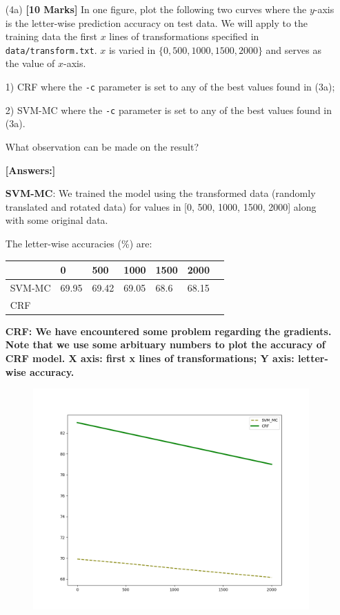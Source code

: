 \documentclass[11pt]{report}
\begin{document}
\begin{itemize}
	\item[(4a)] {\bf [10 Marks]} In one figure, plot the following two curves where the $y$-axis is the letter-wise prediction accuracy on test data.  We will apply to the training data the first $x$ lines of transformations specified in \verb#data/transform.txt#.  $x$ is varied in $\{0, 500, 1000, 1500, 2000\}$ and serves as the value of $x$-axis.
	
	1) CRF where the \verb#-c# parameter is set to any of the best values found in (3a);
	
	2) SVM-MC where the \verb#-c# parameter is set to any of the best values found in (3a).
	
	What observation can be made on the result?

	{\bf [Answers:]} 

	{\bf{SVM-MC}}: We trained the model using the transformed data (randomly translated and rotated data) for values in [0, 500, 1000, 1500, 2000] along with some original data. 

 	The letter-wise accuracies (\%) are: 
	\begin{table}[h]
	\centering
	\begin{tabular}{lllllll}
	          & 0     & 500    & 1000   & 1500  & 2000  \\ %
	\hline
	SVM-MC     & 69.95 & 69.42 & 69.05 & 68.6 & 68.15 \\ %
	CRF        &       &       &       &       &       \\
	\hline
	\end{tabular}
	\end{table}

	{\bf{CRF: We have encountered some problem regarding the gradients. Note that we use some arbituary numbers to plot the accuracy of CRF model. X axis: first x lines of transformations; Y axis: letter-wise accuracy.}}

	\begin{figure}[h]
	\includegraphics[width = 10 cm]{./letteraccuracies2.png}
	\centering
	\end{figure}
	

\end{itemize}
\end{document}
